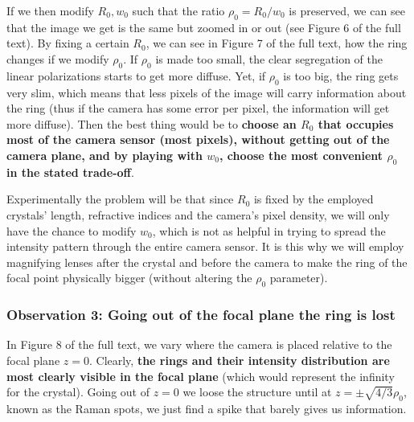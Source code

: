 \documentclass[11pt, a4paper, twoside]{article} %
\begin{document}
If we then modify $R_0,w_0$ such that the ratio $\rho_0=R_0/w_0$ is preserved, we can see that the image we get is the same but zoomed in or out (see Figure 6 of the full text). By fixing a certain $R_0$, we can see in Figure 7 of the full text, how the ring changes if we modify $\rho_0$. If $\rho_0$ is made too small, the clear segregation of the linear polarizations starts to get more diffuse. Yet, if $\rho_0$ is too big, the ring gets very slim, which means that less pixels of the image will carry information about the ring (thus if the camera has some error per pixel, the information will get more diffuse). Then the best thing would be to {\bf choose an $R_0$ that occupies most of the camera sensor (most pixels), without getting out of the camera plane, and by playing with $w_0$, choose the most convenient $\rho_0$ in the stated trade-off}.

Experimentally the problem will be that since $R_0$ is fixed by the employed crystals' length, refractive indices and the camera's pixel density, we will only have the chance to modify $w_0$, which is not as helpful in trying to spread the intensity pattern through the entire camera sensor. It is this why we will employ magnifying lenses after the crystal and before the camera to make the ring of the focal point physically bigger (without altering the $\rho_0$ parameter).\vspace{-0.2cm}
\subsubsection*{Observation 3: Going out of the focal plane the ring is lost}\vspace{-0.12cm}
In Figure 8 of the full text, we vary where the camera is placed relative to the focal plane $z=0$. Clearly, {\bf the rings and their intensity distribution are most clearly visible in the focal plane} (which would represent the infinity for the crystal). Going out of $z=0$ we loose the structure until at $z=\pm\sqrt{4/3}\rho_0$, known as the Raman spots, we just find a spike that barely gives us information.\vspace{-0.1cm}
\end{document}
